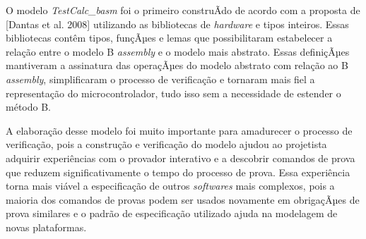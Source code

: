 \documentclass[11pt]{article} %
\begin{document}


O modelo \textit{TestCalc\_basm} foi o primeiro construÃ­do de acordo com a proposta de [Dantas et al.
2008]  utilizando as bibliotecas de \textit{hardware} e tipos inteiros. Essas bibliotecas contêm tipos,
funçÃµes e lemas que possibilitaram estabelecer a relação entre o modelo B \textit{assembly} e o modelo
mais abstrato. Essas definiçÃµes mantiveram a assinatura das operaçÃµes do modelo abstrato com relação ao B
\textit{assembly}, simplificaram o processo de verificação e tornaram mais fiel a representação do
microcontrolador, tudo isso sem a necessidade de estender o método B.

A elaboração desse modelo foi muito importante para amadurecer o processo de verificação, pois a
construção e verificação do modelo ajudou ao projetista adquirir experiências com o provador interativo e
a descobrir comandos de prova que reduzem significativamente o tempo do processo de prova. Essa
experiência torna mais viável a especificação de outros \textit{softwares} mais complexos, pois a
maioria dos comandos de provas podem ser usados novamente em obrigaçÃµes de prova similares e o padrão de
especificação utilizado ajuda na modelagem de novas plataformas. 

\end{document}
